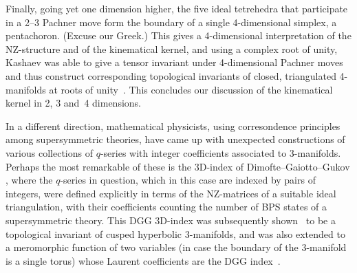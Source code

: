 \documentclass[12pt,reqno]{amsart}
\theoremstyle{definition}
\begin{document}
Finally, going yet one dimension higher, the five ideal tetrehedra that participate in a
2--3 Pachner move form the boundary of a single 4-dimensional simplex, a pentachoron.
(Excuse our Greek.) This gives a 4-dimensional interpretation of the NZ-structure and
of the kinematical kernel, and using a complex root of unity, Kashaev was able to give
a tensor invariant under 4-dimensional Pachner moves and thus construct corresponding
topological invariants of closed, triangulated 4-manifolds at roots of
unity~\cite{Kashaev:4D}. This concludes our discussion of the kinematical kernel in 2, 3
and~4 dimensions.

In a different direction, mathematical physicists, using corresondence principles among
supersymmetric theories, have came up with unexpected constructions of various collections
of \hbox{$q$-series} with integer coefficients associated to 3-manifolds.  Perhaps the most
remarkable of these is the 3D-index of Dimofte--Gaiotto--Gukov \cite{DGG1,DGG2}, where
the $q$-series in question, which in this case are indexed by pairs of integers,
were defined explicitly in terms of the NZ-matrices of a suitable ideal
triangulation, with their coefficients counting the number of BPS states of a supersymmetric
theory. This DGG 3D-index was subsequently shown~\cite{GHRS} to be a topological 
invariant of cusped hyperbolic 3-manifolds, and was also extended to 
a meromorphic function of two variables (in case the boundary of the 3-manifold is a 
single torus) whose Laurent coefficients are the DGG index~\cite{GK:mero}.
\end{document}
